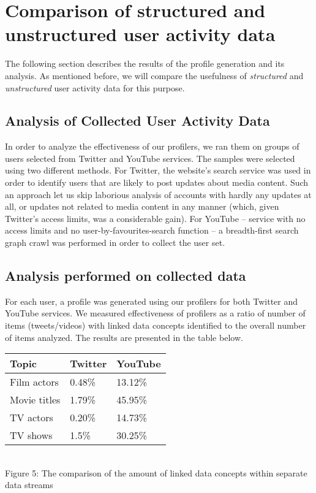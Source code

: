 \section{Comparison of structured and unstructured user activity data}

The following section describes the results of the profile generation and its
analysis. As mentioned before, we will compare the usefulness of \textit{structured}
and \textit{unstructured} user activity data for this purpose.

\subsection{Analysis of Collected User Activity Data}
In order to analyze the effectiveness of our profilers, we ran them on groups of
users selected from Twitter and YouTube services. The samples were selected
using two different methods. For Twitter, the website's search service was used
in order to identify users that are likely to post updates about media content.
Such an approach let us skip laborious analysis of accounts with hardly any
updates at all, or updates not related to media content in any manner (which,
given Twitter's access limits, was a considerable gain). For YouTube -- service
with no access limits and no user-by-favourites-search function -- a breadth-first search
graph crawl was performed in order to collect the user set.

\subsection{Analysis performed on collected data}

For each user, a profile was generated using our profilers for both Twitter and
YouTube services. We measured effectiveness of profilers as a ratio of number of
items (tweets/videos) with linked data concepts identified to the overall number
of items analyzed. The results are presented in the table below.

\begin{center}
  \begin{tabular}{| l | l | l |}
  Topic & Twitter & YouTube \\ \hline
  Film actors & 0.48\% & 13.12\% \\
  Movie titles & 1.79\% & 45.95\% \\
  TV actors & 0.20\% & 14.73\% \\
  TV shows & 1.5\% & 30.25\% \\
  \end{tabular} \\
  Figure 5: The comparison of the amount of linked data concepts within separate data streams \\
\end{center}


